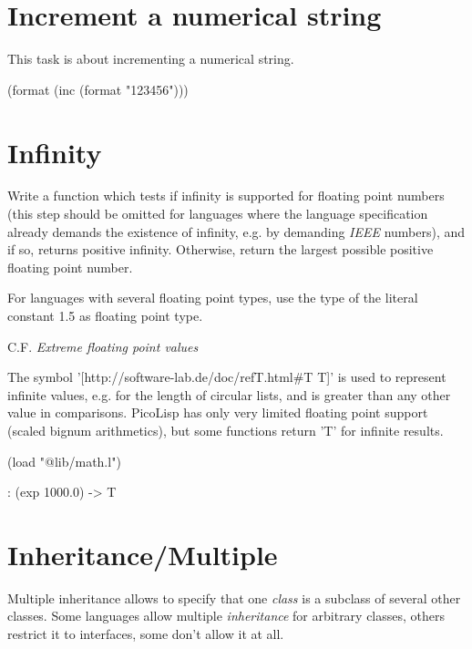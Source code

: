 \pagebreak{}
\section*{Increment a numerical string}

This task is about incrementing a numerical string.

\begin{wideverbatim}

(format (inc (format "123456")))

\end{wideverbatim}

\pagebreak{}
\section*{Infinity}

Write a function which tests if infinity is supported for floating point
numbers (this step should be omitted for languages where the language
specification already demands the existence of infinity, e.g. by
demanding \emph{IEEE} numbers), and if so, returns positive
infinity. Otherwise, return the largest possible positive floating point
number.

For languages with several floating point types, use the type of the
literal constant 1.5 as floating point type.

C.F. \emph{Extreme floating point values}


\begin{wideverbatim}

The symbol '[http://software-lab.de/doc/refT.html#T T]' is used to represent
infinite values, e.g. for the length of circular lists, and is greater than any
other value in comparisons. PicoLisp has only very limited floating point
support (scaled bignum arithmetics), but some functions return 'T' for infinite
results.

(load "@lib/math.l")

: (exp 1000.0)
-> T

\end{wideverbatim}

\pagebreak{}
\section*{Inheritance/Multiple}

Multiple inheritance allows to specify that one \emph{class} is a
subclass of several other classes. Some languages allow multiple
\emph{inheritance} for arbitrary classes, others restrict it to
interfaces, some don't allow it at all.

